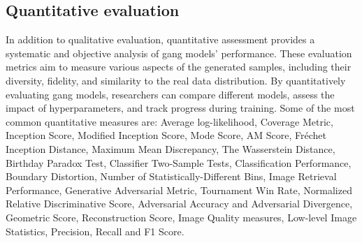 \subsection{Quantitative evaluation}
\label{subsec:quantitative-evaluation}
In addition to qualitative evaluation, quantitative assessment provides a systematic and objective analysis of \gls{gang} models' performance. 
These evaluation metrics aim to measure various aspects of the generated samples, including their diversity, fidelity, and similarity to the real data distribution. 
By quantitatively evaluating \gls{gang} models, researchers can compare different models, assess the impact of hyperparameters, and track progress during training.
Some of the most common quantitative measures are: Average log-likelihood, Coverage Metric, Inception Score, Modified Inception Score, Mode Score, AM Score, Fréchet Inception Distance, 
Maximum Mean Discrepancy, The Wasserstein Distance, Birthday Paradox Test, Classifier Two-Sample Tests, Classification Performance, Boundary Distortion, 
Number of Statistically-Different Bins, Image Retrieval Performance, Generative Adversarial Metric, Tournament Win Rate, Normalized Relative Discriminative Score, Adversarial Accuracy and Adversarial Divergence, 
Geometric Score, Reconstruction Score, Image Quality measures, Low-level Image Statistics, Precision, Recall and F1 Score.
